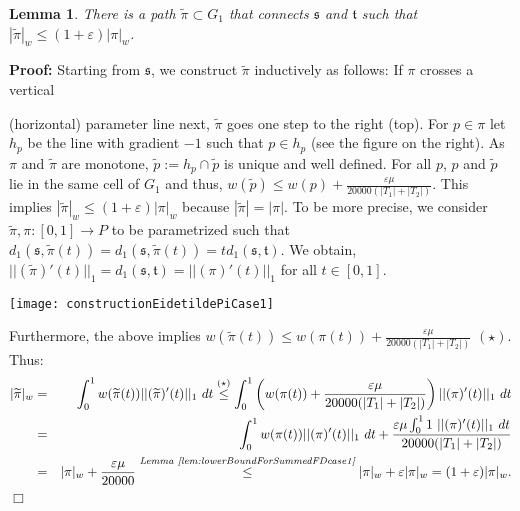 \documentclass[a4paper,11pt]{article}
\newtheorem{lemma}{Lemma}
\newenvironment{proof}{\textbf{Proof:}}{\hspace*{0mm}\hfill\ensuremath{\Box}}
\begin{document}
\begin{lemma}\label{lem:apprQualityG1}
	There is a path $\widetilde{\pi} \subset G_1$ that connects $\mathfrak{s}$ and $\mathfrak{t}$ such that $|\widetilde{\pi}|_w \leq (1 + \varepsilon) |\pi|_w$.
\end{lemma}
\begin{proof} Starting from $\mathfrak{s}$, we construct $\widetilde{\pi}$ inductively as follows: If $\pi$ crosses  a vertical
	
\noindent\begin{minipage}{0.8\linewidth}\vspace*{0.5ex}
 (horizontal) parameter line next, $\widetilde{\pi}$ goes one step to the right (top). For $p \in \pi$ let $h_p$ be the line with gradient $-1$ such that $p \in h_p$ (see the figure on the right). As $\pi$ and $\widetilde{\pi}$ are monotone, $\widetilde{p} := h_p \cap \widetilde{p}$ is unique and well defined. For all $p$,  $p$ and $\widetilde{p}$ lie in the same cell of $G_1$ and thus, $w(\widetilde{p}) \leq w(p) + \frac{\varepsilon \mu}{20000 (|T_1| + |T_2|)}$. This implies $|\widetilde{\pi}|_w \leq (1+\varepsilon) |\pi|_w$ because $|\widetilde{\pi}| = |\pi|$. To be more precise, we consider $\widetilde{\pi}, \pi: [0,1] \rightarrow P$ to be parametrized such that $d_1(\mathfrak{s},\widetilde{\pi}(t)) = d_1(\mathfrak{s},\widetilde{\pi}(t)) = t d_1( \mathfrak{s}, \mathfrak{t})$. We obtain, $||(\widetilde{\pi})'(t)||_1 =d_1(\mathfrak{s},\mathfrak{t})= ||(\pi)'(t)||_1$ for all $t \in [0,1]$.
\end{minipage}
\begin{minipage}{0.2\linewidth}
  \begin{center}
    \texttt{[image: constructionEidetildePiCase1]}
  \end{center}
\end{minipage}\vspace*{0.5ex}
	  Furthermore, the above implies $w(\widetilde{\pi}(t)) \leq w(\pi(t)) + \frac{\varepsilon \mu}{20000 (|T_1| + |T_2|)}$ $(\star)$. Thus:
	\begin{eqnarray*}
		|\widetilde{\pi}|_w & = & \int_{0}^1 w (\widetilde{\pi}(t))  || (\widetilde{\pi})'(t)||_1\ dt \stackrel{(\star)}{\leq} \int_{0}^1 \left( w(\pi(t)) + \frac{\varepsilon \mu}{20000 (|T_1| + |T_2|)} \right)  || (\pi)'(t)||_1\ dt\\
		& = & \int_{0}^1  w(\pi(t))  || (\pi)'(t)||_1\ dt + \frac{\varepsilon \mu \int_{0}^1  1 \ || (\pi)'(t)||_1\ dt}{20000 (|T_1| + |T_2|)}\\
		& =& |\pi|_w + \frac{\varepsilon \mu}{20000} \stackrel{\textit{Lemma~\ref{lem:lowerBoundForSummedFDcase1}}}{\leq}  |\pi|_w + \varepsilon |\pi|_w = (1+\varepsilon) |\pi|_w.
	\end{eqnarray*}
\end{proof}
\end{document}
